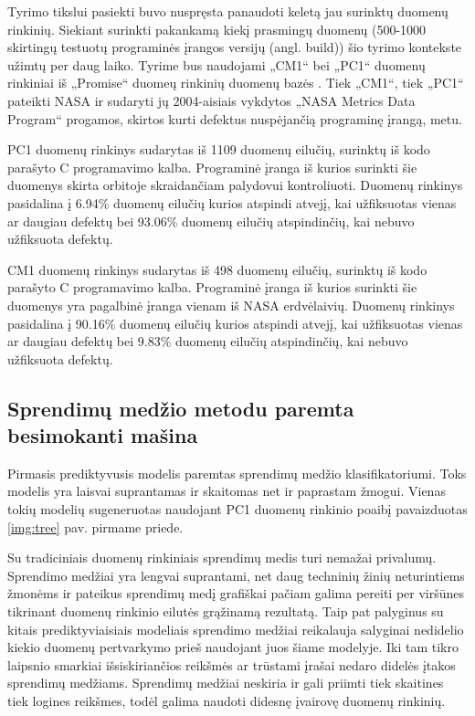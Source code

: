 \documentclass{VUMIFPSbakalaurinis}
\begin{document}
Tyrimo tikslui pasiekti buvo nuspręsta panaudoti keletą jau surinktų duomenų rinkinių. Siekiant surinkti pakankamą kiekį prasmingų duomenų (500-1000 skirtingų testuotų programinės įrangos versijų (angl. build)) šio tyrimo kontekste užimtų per daug laiko. Tyrime bus naudojami  „CM1“ bei „PC1“ duomenų rinkiniai iš  „Promise“ duomeų rinkinių duomenų bazės \cite{Sayyad-Shirabad+Menzies:2005}. Tiek „CM1“, tiek „PC1“ pateikti NASA ir sudaryti jų 2004-aisiais vykdytos „NASA Metrics Data Program“ progamos, skirtos kurti defektus nuspėjančią programinę įrangą, metu.

PC1 duomenų rinkinys sudarytas iš 1109 duomenų eilučių, surinktų iš kodo parašyto C programavimo kalba. Programinė įranga iš kurios surinkti šie duomenys skirta orbitoje skraidančiam palydovui kontroliuoti. Duomenų rinkinys pasidalina į 6.94\% duomenų eilučių kurios atspindi atvejį, kai užfiksuotas vienas ar daugiau defektų bei 93.06\% duomenų eilučių atspindinčių, kai nebuvo užfiksuota defektų.

CM1 duomenų rinkinys sudarytas iš 498 duomenų eilučių, surinktų iš kodo parašyto C programavimo kalba. Programinė įranga iš kurios surinkti šie duomenys yra pagalbinė įranga vienam iš NASA erdvėlaivių. Duomenų rinkinys pasidalina į 90.16\% duomenų eilučių kurios atspindi atvejį, kai užfiksuotas vienas ar daugiau defektų bei 9.83\% duomenų eilučių atspindinčių, kai nebuvo užfiksuota defektų.

\subsection{Sprendimų medžio metodu paremta besimokanti mašina}
Pirmasis prediktyvusis modelis paremtas sprendimų medžio klasifikatoriumi. Toks modelis yra laisvai suprantamas ir skaitomas net ir paprastam žmogui. Vienas tokių modelių sugeneruotas naudojant PC1 duomenų rinkinio poaibį pavaizduotas \ref{img:tree} pav. pirmame priede. 

Su tradiciniais duomenų rinkiniais sprendimų medis turi nemažai privalumų. Sprendimo medžiai yra lengvai suprantami, net daug techninių žinių neturintiems žmonėms ir pateikus sprendimų medį grafiškai pačiam galima pereiti per viršūnes tikrinant duomenų rinkinio eilutės grąžinamą rezultatą. Taip pat palyginus su kitais prediktyviaisiais modeliais sprendimo medžiai reikalauja salyginai nedidelio kiekio duomenų pertvarkymo prieš naudojant juos šiame modelyje. Iki tam tikro laipsnio smarkiai išsiskiriančios reikšmės ar trūstami įrašai nedaro didelės įtakos sprendimų medžiams. Sprendimų medžiai neskiria ir gali priimti tiek skaitines tiek logines reikšmes, todėl galima naudoti didesnę įvairovę duomenų rinkinių.
\end{document}
